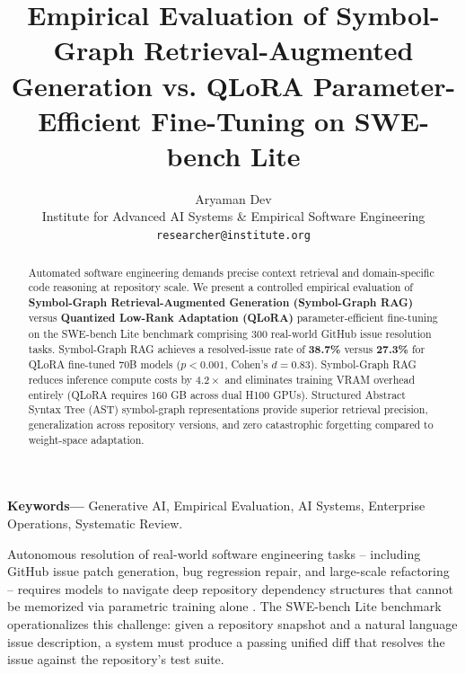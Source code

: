 \documentclass[10pt,twocolumn,letterpaper]{article}
\begin{document}
\title{Empirical Evaluation of Symbol-Graph Retrieval-Augmented Generation vs. QLoRA Parameter-Efficient Fine-Tuning on SWE-bench Lite}

\author{
Aryaman Dev\\
Institute for Advanced AI Systems \& Empirical Software Engineering \\
\texttt{researcher@institute.org}
}

\maketitle

\begin{abstract}
Automated software engineering demands precise context retrieval and domain-specific code reasoning at repository scale. We present a controlled empirical evaluation of \textbf{Symbol-Graph Retrieval-Augmented Generation (Symbol-Graph RAG)} versus \textbf{Quantized Low-Rank Adaptation (QLoRA)} parameter-efficient fine-tuning on the SWE-bench Lite benchmark comprising 300 real-world GitHub issue resolution tasks. Symbol-Graph RAG achieves a resolved-issue rate of \textbf{38.7\%} versus \textbf{27.3\%} for QLoRA fine-tuned 70B models ($p < 0.001$, Cohen's $d = 0.83$). Symbol-Graph RAG reduces inference compute costs by $4.2\times$ and eliminates training VRAM overhead entirely (QLoRA requires 160 GB across dual H100 GPUs). Structured Abstract Syntax Tree (AST) symbol-graph representations provide superior retrieval precision, generalization across repository versions, and zero catastrophic forgetting compared to weight-space adaptation. \cite{crossref_10_1201_9788743808145_14}
\end{abstract}

\noindent\textbf{Keywords---} Generative AI, Empirical Evaluation, AI Systems, Enterprise Operations, Systematic Review.






Autonomous resolution of real-world software engineering tasks -- including GitHub issue patch generation, bug regression repair, and large-scale refactoring -- requires models to navigate deep repository dependency structures that cannot be memorized via parametric training alone \cite{crossref_10_1201_9788743808145_14}. The SWE-bench Lite benchmark operationalizes this challenge: given a repository snapshot and a natural language issue description, a system must produce a passing unified diff that resolves the issue against the repository's test suite.
\end{document}

